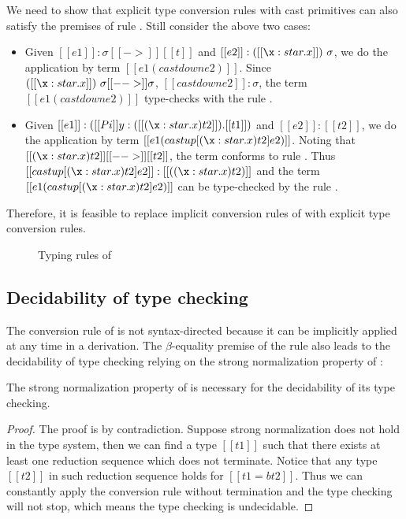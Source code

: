We need to show that explicit type conversion rules with cast primitives can also satisfy the premises of rule . Still consider the above two cases:
\begin{itemize}
\item Given $[[e1]]:\sigma [[->]] [[t]]$ and $[[e2]] : ([[\x:star.x]])~\sigma$, we do the application by term $[[e1 (castdown e2)]]$. Since $([[\x:star.x]])~\sigma [[-->]] \sigma$, $[[castdown e2]] : \sigma$, the term $[[e1 (castdown e2)]]$ type-checks with the rule .
\item Given $[[e1]] : ([[Pi]] y:([[(\x : star . x) t2]]).[[t1]])$ and $[[e2]] : [[t2]]$, we do the application by term $[[e1 (castup [ (\x : star . x) t2 ] e2)]]$. Noting that $[[(\x : star . x) t2]] [[-->]] [[t2]]$, the term conforms to rule . Thus $[[castup [ (\x : star . x) t2 ] e2]] : [[((\x : star . x) t2)]]$ and the term $[[e1 (castup [ (\x : star . x) t2 ] e2)]]$ can be type-checked by the rule .
\end{itemize}

Therefore, it is feasible to replace implicit conversion rules of \cc with explicit type conversion rules.

\begin{figure}[ht]
	\ottdefnexpr{}
	\caption{Typing rules of \expcc}
	\label{fig:ecc:typerule}
\end{figure}

\subsection{Decidability of type checking}
The conversion rule of \cc is not syntax-directed because it can be implicitly applied at any time in a derivation. The $\beta$-equality premise of the rule also leads to the decidability of type checking relying on the strong normalization property of \cc:

\begin{thm}
The strong normalization property of \cc is necessary for the decidability of its type checking.
\end{thm}

\begin{proof}
The proof is by contradiction. Suppose strong normalization does not hold in the type system, then we can find a type $[[t1]]$ such that there exists at least one reduction sequence which does not terminate. Notice that any type $[[t2]]$ in such reduction sequence holds for $[[t1 =b t2]]$. Thus we can constantly apply the conversion rule without termination and the type checking will not stop, which means the type checking is undecidable.
\end{proof}

